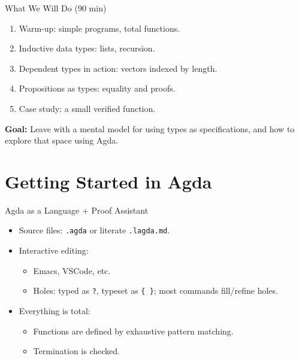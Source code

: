 \documentclass[aspectratio=169]{beamer}
\begin{document}
\begin{frame}{What We Will Do (90 min)}
  \begin{enumerate}
    \item Warm-up: simple programs, total functions.
    \item Inductive data types: lists, recursion.
    \item Dependent types in action: vectors indexed by length.
    \item Propositions as types: equality and proofs.
    \item Case study: a small verified function.
  \end{enumerate}
  \vfill
  \textbf{Goal:} Leave with a mental model for using types as specifications,
  and how to explore that space using Agda.
\end{frame}

\section{Getting Started in Agda}

\begin{frame}{Agda as a Language + Proof Assistant}
  \begin{itemize}
    \item Source files: \texttt{.agda} or literate \texttt{.lagda.md}.
    \item Interactive editing:
      \begin{itemize}
        \item Emacs, VSCode, etc.
        \item Holes: typed as \texttt{?}, typeset as
          \texttt{\{\!~\!\}}; most commands fill/refine holes.
      \end{itemize}
    \item Everything is total:
      \begin{itemize}
        \item Functions are defined by exhaustive pattern matching.
        \item Termination is checked.
      \end{itemize}
  \end{itemize}
\end{frame}
\end{document}
